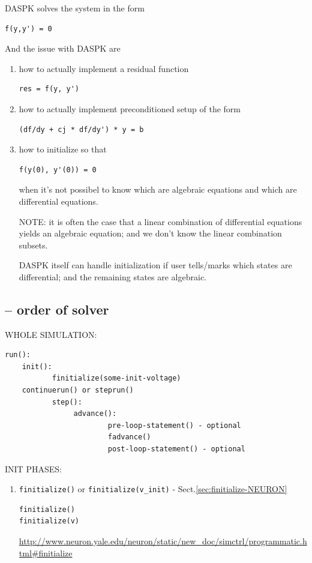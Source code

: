 \begin{enumerate}
\begin{enumerate}
DASPK solves the system in the form
\begin{verbatim}
f(y,y') = 0
\end{verbatim}
And the issue with DASPK are
\begin{enumerate}
  \item how to actually implement a residual function 
\begin{verbatim}
res = f(y, y')
\end{verbatim}

  \item how to actually implement preconditioned setup of the form

\begin{verbatim}
(df/dy + cj * df/dy') * y = b
\end{verbatim}

  \item how to initialize so that
  
\begin{verbatim}
f(y(0), y'(0)) = 0
\end{verbatim}
when it's not possibel to know which are algebraic equations and which are
differential equations.

NOTE: it is often the case that a linear combination of differential equations
yields an algebraic equation; and we don't know the linear combination subsets.

DASPK itself can handle initialization if user tells/marks which states are
differential; and the remaining states are algebraic.
\end{enumerate}

\end{enumerate}

\end{enumerate}

\subsection{-- order of solver}
\label{sec:run-NEURON}

WHOLE SIMULATION:  
\begin{verbatim}
run():
    init():
           finitialize(some-init-voltage)
    continuerun() or steprun()
           step():
                advance():
                        pre-loop-statement() - optional
                        fadvance()
                        post-loop-statement() - optional
\end{verbatim}

INIT PHASES:
\begin{enumerate}
  
  \item \verb!finitialize()! or \verb!finitialize(v_init)! -
  Sect.\ref{sec:finitialize-NEURON}
  
\begin{verbatim}
finitialize()
finitialize(v)
\end{verbatim}

\url{http://www.neuron.yale.edu/neuron/static/new_doc/simctrl/programmatic.html#finitialize}

\end{enumerate}

